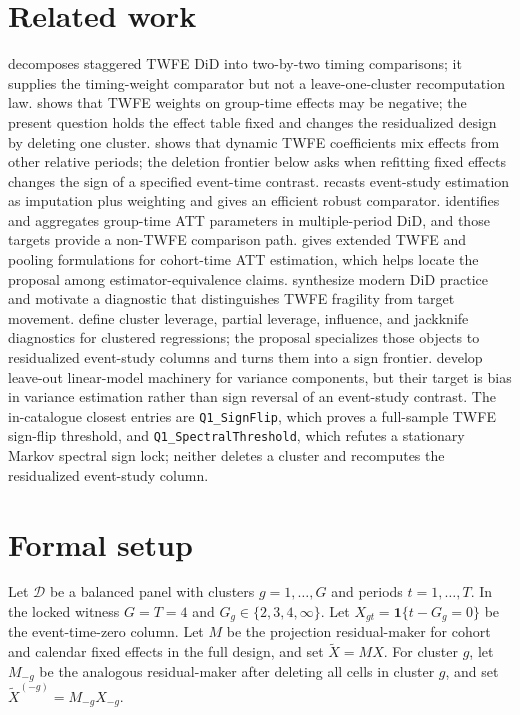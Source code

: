 \documentclass[11pt]{article}
\newcommand{\one}{\mathbf{1}}
\theoremstyle{definition}
\theoremstyle{plain}
\theoremstyle{remark}
\begin{document}
\section{Related work}
\citet{GoodmanBacon2021} decomposes staggered TWFE DiD into two-by-two timing comparisons; it supplies the timing-weight comparator but not a leave-one-cluster recomputation law. \citet{DeChaisemartinDHaultfoeuille2020} shows that TWFE weights on group-time effects may be negative; the present question holds the effect table fixed and changes the residualized design by deleting one cluster. \citet{SunAbraham2021} shows that dynamic TWFE coefficients mix effects from other relative periods; the deletion frontier below asks when refitting fixed effects changes the sign of a specified event-time contrast. \citet{BorusyakJaravelSpiess2024} recasts event-study estimation as imputation plus weighting and gives an efficient robust comparator. \citet{CallawaySantAnna2021} identifies and aggregates group-time ATT parameters in multiple-period DiD, and those targets provide a non-TWFE comparison path. \citet{Wooldridge2023} gives extended TWFE and pooling formulations for cohort-time ATT estimation, which helps locate the proposal among estimator-equivalence claims. \citet{RothSantAnnaBilinskiPoe2023} synthesize modern DiD practice and motivate a diagnostic that distinguishes TWFE fragility from target movement. \citet{MacKinnonNielsenWebb2023} define cluster leverage, partial leverage, influence, and jackknife diagnostics for clustered regressions; the proposal specializes those objects to residualized event-study columns and turns them into a sign frontier. \citet{KlineSaggioSolvsten2020} develop leave-out linear-model machinery for variance components, but their target is bias in variance estimation rather than sign reversal of an event-study contrast. The in-catalogue closest entries are \texttt{Q1\_SignFlip}, which proves a full-sample TWFE sign-flip threshold, and \texttt{Q1\_SpectralThreshold}, which refutes a stationary Markov spectral sign lock; neither deletes a cluster and recomputes the residualized event-study column.

\section{Formal setup}
Let $\mathcal{D}$ be a balanced panel with clusters $g=1,\ldots,G$ and periods $t=1,\ldots,T$. In the locked witness $G=T=4$ and $G_g\in\{2,3,4,\infty\}$. Let $X_{gt}=\one\{t-G_g=0\}$ be the event-time-zero column. Let $M$ be the projection residual-maker for cohort and calendar fixed effects in the full design, and set $\tilde X=MX$. For cluster $g$, let $M_{-g}$ be the analogous residual-maker after deleting all cells in cluster $g$, and set $\tilde X^{(-g)}=M_{-g}X_{-g}$.
\end{document}
